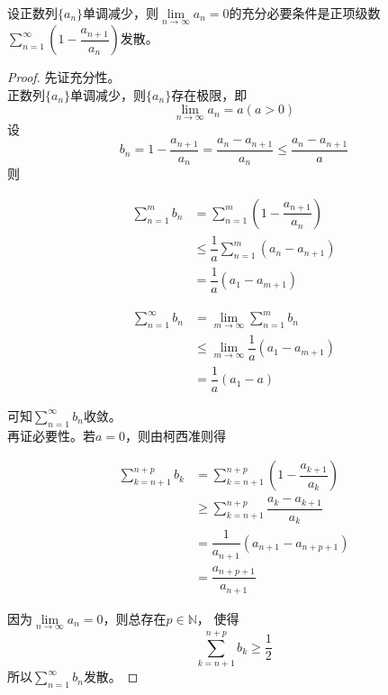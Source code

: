 \begin{theorem}[Sapagof判别法]

设正数列$\{a_n\}$单调减少，则$\lim\limits_{n \to \infty}{a_n} =  0$的充分必要条件是正项级数$\sum\limits_{n = 1}^{\infty}{\left( 1 - \dfrac{a_{n + 1}}{a_n} \right)}$发散。
    
\end{theorem}

\begin{proof}
    
    先证充分性。\\
    正数列$\{a_n\}$单调减少，则$\{a_n\}$存在极限，即
    \[\lim\limits_{n \to \infty}{a_n} = a(a > 0)\]
    设
    \[b_n = 1 - \dfrac{a_{n + 1}}{a_n} = \dfrac{a_n - a_{n + 1}}{a_n} \leq \dfrac{a_n - a_{n + 1}}{a}\]
    则

    \begin{align*}
        \sum\limits_{n = 1}^{m}{b_n} & = \sum\limits_{n = 1}^{m}{(1 - \dfrac{a_{n + 1}}{a_{n}})} \\
        & \leq \dfrac{1}{a} \sum\limits_{n = 1}^{m}{(a_n - a_{n + 1})} \\
        & = \dfrac{1}{a}(a_1 - a_{m + 1})
    \end{align*}

    \begin{align*}
        \sum\limits_{n = 1}^{\infty}{b_n} & = \lim\limits_{m \to \infty}{\sum\limits_{n = 1}^{m}{b_n}} \\
        & \leq \lim\limits_{m \to \infty}{\dfrac{1}{a}(a_1 - a_{m + 1})} \\
        & = \dfrac{1}{a}(a_1 - a)
    \end{align*}

    可知$\sum\limits_{n = 1}^{\infty}{b_n}$收敛。\\
    再证必要性。若$a = 0$，则由柯西准则得

    \begin{align*}
        \sum\limits_{k = n + 1}^{n + p}{b_k} & = \sum\limits_{k = n + 1}^{n + p}{(1 - \dfrac{a_{k + 1}}{a_k})} \\
        & \geq \sum\limits_{k = n + 1}^{n + p}{\dfrac{a_k - a_{k + 1}}{a_k}} \\
        & = \dfrac{1}{a_{n + 1}}(a_{n + 1} - a_{n + p + 1}) \\
        & = \dfrac{a_{n + p + 1}}{a_{n + 1}}
    \end{align*}

    因为$\lim\limits_{n \to \infty}{a_n} =  0$，则总存在$p \in \mathbb{N}$，
    使得
    \[\sum\limits_{k = n + 1}^{n + p}{b_k} \geq \dfrac{1}{2}\]
    所以$\sum\limits_{n = 1}^{\infty}{b_n}$发散。

\end{proof}

